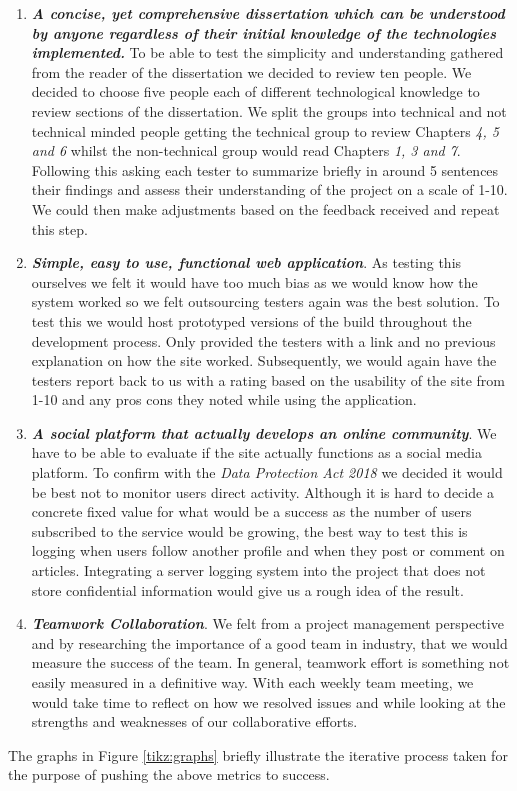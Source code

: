 \begin{enumerate}
  \item \textbf{\textit{A  concise,  yet  comprehensive  dissertation  which  can  be  understood  by
anyone  regardless  of  their  initial  knowledge  of  the  technologies  implemented.}} To be able to test the simplicity and understanding gathered from the reader of the dissertation we decided to review ten people. We decided to choose five people each of different technological knowledge to review sections of the dissertation. We split the groups into technical and not technical minded people getting the technical group to review Chapters \textit{4, 5 and 6} whilst the non-technical group would read Chapters \textit{1, 3 and 7}. Following this asking each tester to summarize briefly in around 5 sentences their findings and assess their understanding of the project on a scale of 1-10. We could then make adjustments based on the feedback received and repeat this step.

  \item \textbf{\textit{ Simple, easy to use, functional web application}}. As testing this ourselves we felt it would have too much bias as we would know how the system worked so we felt outsourcing testers again was the best solution. To test this we would host prototyped versions of the build throughout the development process. Only provided the testers with a link and no previous explanation on how the site worked. Subsequently, we would again have the testers report back to us with a rating based on the usability of the site from 1-10 and any pros cons they noted while using the application.
  
  \item \textbf{\textit{A social platform that actually develops an online community}}. We have to be able to evaluate if the site actually functions as a social media platform. To confirm with the \textit{Data Protection Act 2018} \cite{dpa} we decided it would be best not to monitor users direct activity. Although it is hard to decide a concrete fixed value for what would be a success as the number of users subscribed to the service would be growing, the best way to test this is logging when users follow another profile and when they post or comment on articles. Integrating a server logging system into the project that does not store confidential information would give us a rough idea of the result.
  
  \item \textbf{\textit{Teamwork Collaboration}}. We felt from a project management perspective and by researching the importance of a good team in industry, that we would measure the success of the team. In general, teamwork effort is something not easily measured in a definitive way. With each weekly team meeting, we would take time to reflect on how we resolved issues and while looking at the strengths and weaknesses of our collaborative efforts. 

\end{enumerate}
 The graphs in Figure \ref{tikz:graphs} briefly illustrate the iterative process taken for the purpose of pushing the above metrics to success.
 
